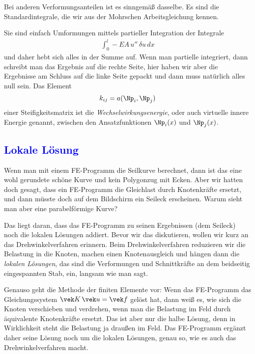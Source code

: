Bei anderen Verformungsanteilen ist es sinngem\"{a}{\ss} dasselbe. Es sind die Standardintegrale, die wir aus der Mohrschen Arbeitsgleichung kennen.

Sie sind einfach Umformungen mittels partieller Integration der Integrale
\begin{align}
\int_{0}^{l} - EA\,u''\,\delta u\,dx
\end{align}
und daher hebt sich alles in der Summe auf. Wenn man partielle integriert, dann schreibt man das Ergebnis auf die rechte Seite, hier haben wir aber die Ergebnisse am Schluss auf die linke Seite gepackt und dann muss nat\"{u}rlich alles null sein.
Das Element
\begin{align}
k_{ij} = a(\Np_i,\Np_j)
\end{align}
einer Steifigkeitsmatrix ist die {\em Wechselwirkungsenergie\/}, oder auch virtuelle innere Energie genannt, zwischen
den Ansatzfunktionen $\Np_i(x)$ und $\Np_j(x)$.

{\textcolor{blue}{\section{Lokale L\"{o}sung}}}
Wenn man mit einem FE-Programm die Seilkurve berechnet, dann ist das eine wohl gerundete sch\"{o}ne Kurve und kein Polygonzug mit Ecken. Aber wir hatten doch gesagt, dass ein FE-Programm die Gleichlast durch Knotenkr\"{a}fte ersetzt, und dann m\"{u}sste doch auf dem Bildschirm ein Seileck erscheinen. Warum sieht man aber eine parabelf\"{o}rmige Kurve?

Das liegt daran, dass das FE-Programm zu seinen Ergebnissen (dem Seileck) noch die lokalen L\"{o}sungen addiert. Bevor wir das diskutieren, wollen wir kurz an das Drehwinkelverfahren erinnern. Beim Drehwinkelverfahren reduzieren wir die Belastung in die Knoten, machen einen Knotenausgleich und h\"{a}ngen dann die {\em lokalen L\"{o}sungen\/}, das sind die Verformungen und Schnittkr\"{a}fte an dem beidseitig eingespannten Stab, ein, langsam wie man sagt.

Genauso geht die Methode der finiten Elemente vor: Wenn das FE-Programm das Gleichungssystem $\vek K\,\vek u = \vek f $ gel\"{o}st hat, dann wei{\ss} es, wie sich die Knoten verschieben und verdrehen, wenn man die Belastung im Feld durch \"{a}quivalente Knotenkr\"{a}fte ersetzt. Das ist aber nur die halbe L\"{o}sung, denn in Wirklichkeit steht die Belastung ja drau{\ss}en im Feld. Das FE-Programm erg\"{a}nzt daher seine L\"{o}sung noch um die lokalen L\"{o}sungen, genau so, wie es auch das Drehwinkelverfahren macht.

